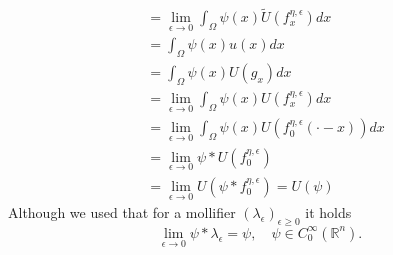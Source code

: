 \documentclass[A4,12pt,twoside]{book}
\begin{document}
{\begin{align*}
    &= \lim_{\epsilon \to 0} \int_\Omega \psi (x) \tilde{U} (f_x^{\eta,\epsilon} ) dx \\
    &= \int_\Omega \psi (x) u(x) dx \\
    &= \int_\Omega \psi (x) U(g_x) dx \\
    &= \lim_{\epsilon \to 0} \int_\Omega \psi (x) U(f_x^{\eta,\epsilon} ) dx \\
    &= \lim_{\epsilon \to 0} \int_\Omega \psi (x) U(f_0^{\eta,\epsilon} (\cdot -x) ) dx \\
    &= \lim_{\epsilon \to 0} \psi * U(f_0^{\eta,\epsilon}  ) \\
    &= \lim_{\epsilon \to 0}  U(\psi *f_0^{\eta,\epsilon}  ) = U(\psi)
\end{align*}
Although we used that for a mollifier $(\lambda_\epsilon)_{\epsilon \geq 0}$ it holds
\[
\lim_{\epsilon \to 0} \psi * \lambda_\epsilon = \psi, \quad \psi \in C_0^\infty (\mathbb{R}^n).
\]

}
\end{document}
